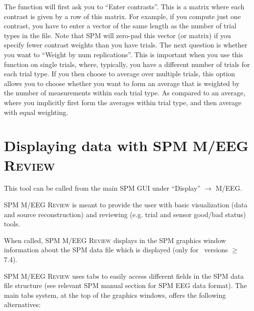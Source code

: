 The function will first ask you to ``Enter contrasts''. This is a matrix where each contrast is given by a row of this matrix. For example, if you compute just one contrast, you have to enter a vector of the same length as the number of trial types in the file. Note that SPM will zero-pad this vector  (or matrix) if you specify fewer contrast weights than you have trials.  The next question is whether you want to ``Weight by num replications''. This is important when you use this function on single trials, where, typically, you have a different number of trials for each trial type. If you then choose to average over multiple trials, this option allows you to choose whether you want to form an average that is weighted by the number of measurements within each trial type. As compared to an average, where you implicitly first form the averages within trial type, and then average with equal weighting.

\section{Displaying data with SPM M/EEG \textsc{Review}}
This tool can be called from the main SPM GUI under ``Display'' $\rightarrow$ M/EEG.

SPM M/EEG \textsc{Review} is meant to provide the user with basic visualization (data and source reconstruction) and reviewing (e.g. trial and sensor good/bad status) tools.

When called, SPM M/EEG \textsc{Review} displays in the SPM graphics window information about the SPM data file which is displayed (only for \matlab\ versions $\geq$ 7.4).

SPM M/EEG \textsc{Review} uses tabs to easily access different fields in the SPM data file structure (see relevant SPM manual section for SPM EEG data format). The main tabs system, at the top of the graphics windows, offers the following alternatives:

